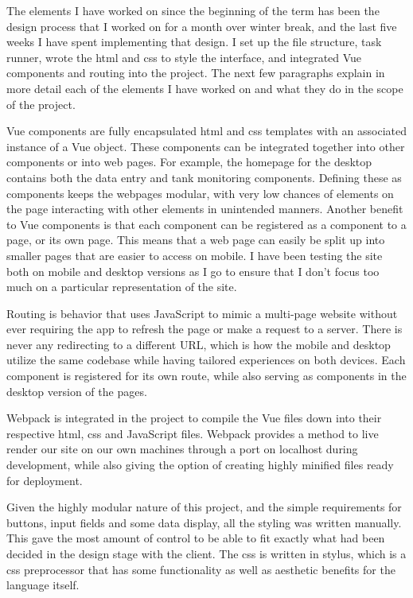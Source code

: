 \documentclass[draftclsnofoot,onecolumn,letterpaper,10pt,compsoc]{IEEEtran}
\begin{document}
The elements I have worked on since the beginning of the term has been the design process that I worked on for a month over winter break, and the last five weeks I have spent implementing that design.
I set up the file structure, task runner, wrote the html and css to style the interface, and integrated Vue components and routing into the project.
The next few paragraphs explain in more detail each of the elements I have worked on and what they do in the scope of the project.


Vue components are fully encapsulated html and css templates with an associated instance of a Vue object.
These components can be integrated together into other components or into web pages.
For example, the homepage for the desktop contains both the data entry and tank monitoring components.
Defining these as components keeps the webpages modular, with very low chances of elements on the page interacting with other elements in unintended manners.
Another benefit to Vue components is that each component can be registered as a component to a page, or its own page.
This means that a web page can easily be split up into smaller pages that are easier to access on mobile.
I have been testing the site both on mobile and desktop versions as I go to ensure that I don't focus too much on a particular representation of the site.


Routing is behavior that uses JavaScript to mimic a multi-page website without ever requiring the app to refresh the page or make a request to a server.
There is never any redirecting to a different URL, which is how the mobile and desktop utilize the same codebase while having tailored experiences on both devices.
Each component is registered for its own route, while also serving as components in the desktop version of the pages.


Webpack is integrated in the project to compile the Vue files down into their respective html, css and JavaScript files.
Webpack provides a method to live render our site on our own machines through a port on localhost during development, while also giving the option of creating highly minified files ready for deployment.


Given the highly modular nature of this project, and the simple requirements for buttons, input fields and some data display, all the styling was written manually.
This gave the most amount of control to be able to fit exactly what had been decided in the design stage with the client.
The css is written in stylus, which is a css preprocessor that has some functionality as well as aesthetic benefits for the language itself.
\end{document}
